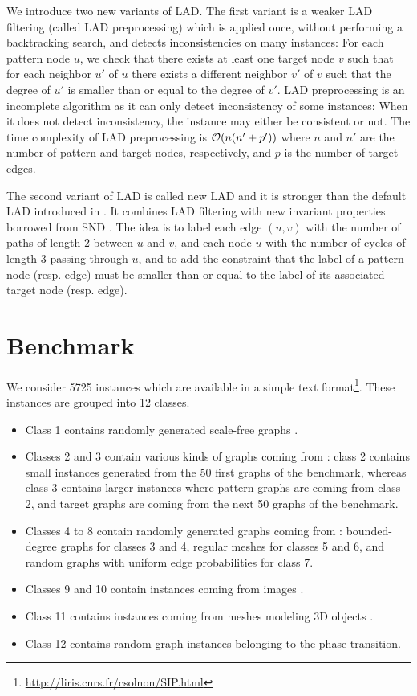 \documentclass{llncs}
\begin{document}
We introduce two new variants of LAD. The first variant is a weaker LAD filtering (called LAD
preprocessing) which is applied once, without performing a backtracking search, and detects
inconsistencies on many instances: For each pattern node $u$, we check that there exists at least
one target node $v$ such that for each neighbor $u'$ of $u$ there exists a different neighbor $v'$
of $v$ such that the degree of $u'$ is smaller than or equal to the degree of $v'$. LAD
preprocessing is an incomplete algorithm as it can only detect inconsistency of some instances: When
it does not detect inconsistency, the instance may either be consistent or not. The time complexity
of LAD preprocessing is ${\cal O}(n(n'+p'))$ where $n$ and $n'$ are the number of pattern and target
nodes, respectively, and $p$ is the number of target edges.

The second variant of LAD is called new LAD and it is stronger than the default LAD introduced in
\cite{Solnon:2010}. It combines LAD filtering with new invariant properties borrowed from SND
\cite{Audemard:2014}. The idea is to label each edge $(u,v)$ with the number of paths of length 2
between $u$ and $v$, and each node $u$ with the number of cycles of length 3 passing through $u$,
and to add the constraint that the label of a pattern node (resp. edge) must be smaller than or
equal to the label of its associated target node (resp. edge).

\section{Benchmark}

We consider 5725 instances which are available in a simple text
format\footnote{\url{http://liris.cnrs.fr/csolnon/SIP.html}}. These instances are grouped into 12
classes.

\begin{itemize}
\item Class 1 contains randomly generated scale-free graphs \cite{}.
\item Classes 2 and 3 contain various kinds of graphs coming from \cite{}: class 2 contains small instances generated from the 50 first graphs of the benchmark, whereas class 3 contains larger instances where pattern graphs are coming from class 2, and target graphs are coming from the next 50 graphs of the benchmark.
\item Classes 4 to 8 contain randomly generated graphs coming from \cite{GraphDatabase}: bounded-degree graphs for classes 3 and 4, regular meshes for classes 5 and 6, and random graphs with uniform edge probabilities for class 7.
\item Classes 9 and 10 contain instances coming from images \cite{}.
\item Class 11 contains instances coming from meshes modeling 3D objects \cite{}.
\item Class 12 contains random graph instances belonging to the phase transition.
\end{itemize}
\end{document}
